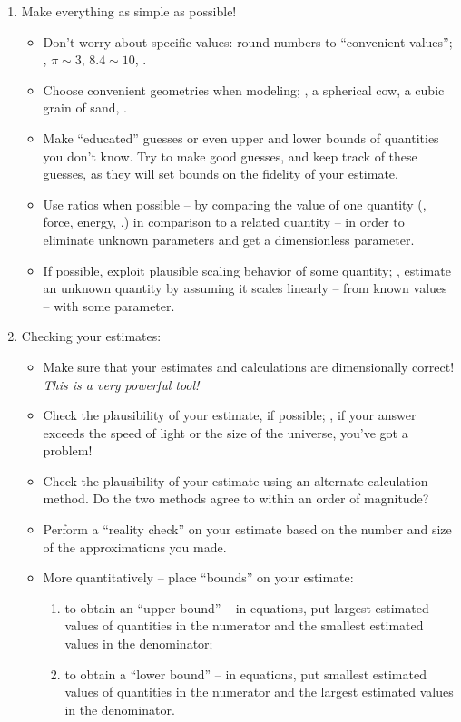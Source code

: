 \begin{enumerate}
\item Make everything as simple as possible!
%
\begin{itemize}
\item Don't worry about specific values: round numbers to ``convenient values''; \eg, $\pi\sim 3$, $8.4\sim 10$, \etc.
%
\item Choose convenient geometries when modeling; \eg, a spherical cow, a cubic grain of sand, \etc.
%
\item Make ``educated'' guesses or even upper and lower bounds of quantities you don't know. Try to make good guesses, and keep track of these guesses, as they will set bounds on the fidelity of your estimate.
%
\item Use ratios when possible -- by comparing the value of one quantity (\eg, force, energy, \etc.) in comparison to a related quantity -- in order to eliminate unknown parameters and get a dimensionless parameter.
%
\item If possible, exploit plausible scaling behavior of some quantity; \ie, estimate an unknown quantity by assuming it scales linearly -- from known values -- with some parameter.
\end{itemize}
%
\item Checking your estimates:
%
\begin{itemize}
\item Make sure that your estimates and calculations are dimensionally correct! \emph{This is a very powerful tool!}
%
\item Check the plausibility of your estimate, if possible; \eg, if your answer exceeds the speed of light or the size of the universe, you've got a problem!
%
\item Check the plausibility of your estimate using an alternate calculation method. Do the two methods agree to within an order of magnitude?
%
\item Perform a ``reality check'' on your estimate based on the number and size of the approximations you made.
%
\item More quantitatively -- place ``bounds'' on your estimate:
%
\begin{enumerate}
\item to obtain an ``upper bound'' -- in equations, put largest estimated values of quantities in the numerator and the smallest estimated values in the denominator;
\item to obtain a ``lower bound'' -- in equations, put smallest estimated values of quantities in the numerator and the largest estimated values in the denominator.
\end{enumerate}
%
\end{itemize}
%
\end{enumerate}




